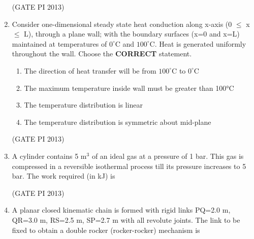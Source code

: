 \documentclass[journal,12pt,onecolumn]{IEEEtran}
\theoremstyle{remark}
\begin{document}
\begin{enumerate}
\hfill (GATE PI 2013)

\item Consider one-dimensional steady state heat conduction along x-axis (0 $\leq$ x $\leq$ L), through a plane 
wall; with the boundary surfaces (x=0 and x=L) maintained at temperatures of $0^\circ$C and $100^\circ$C. 
Heat is generated uniformly throughout the wall. Choose the \textbf{CORRECT} statement. 
\begin{enumerate}
\item The direction of heat transfer will be from $100^\circ$C to $0^\circ$C 
\item The maximum temperature inside wall must be greater than 100°C
\item The temperature distribution is linear
\item The temperature distribution is symmetric about mid-plane 
\end{enumerate}

\hfill (GATE PI 2013)

\item A cylinder contains 5 m$^3$ of an ideal gas at a pressure of 1 bar. This gas is compressed 
in a reversible isothermal process till its pressure increases to 5 bar. The work required (in kJ) is 

\begin{enumerate}
\end{enumerate}

\hfill (GATE PI 2013)

\item A planar closed kinematic chain is formed with rigid links PQ=2.0 m, QR=3.0 m, RS=2.5 m, SP=2.7 m with all revolute joints. The link to be fixed to obtain a double rocker (rocker-rocker) mechanism is 

\begin{enumerate}
\end{enumerate}


\end{enumerate}
\end{document}
